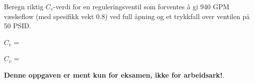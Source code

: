 

Beregn riktig $C_v$-verdi for en reguleringsventil som forventes å gi 940 GPM væskeflow (med spesifikk vekt 0.8) ved full åpning og et trykkfall over ventilen på 50 PSID.

\vskip 10pt

$C_v$ = \underbar{\hskip 50pt}







$C_v$ = 







{\bf Denne oppgaven er ment kun for eksamen, ikke for arbeidsark!}.


